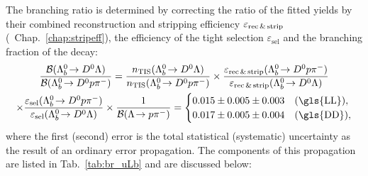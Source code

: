 The branching ratio is determined by correcting the ratio of the fitted yields by their combined reconstruction and stripping efficiency $\varepsilon_\text{rec\,\&\,strip}$ (\cf{}~Chap.~\ref{chap:stripeff}), the efficiency of the tight selection $\varepsilon_\text{sel}$ and the branching fraction of the \decay{\Lz}{\proton\pim} decay:
\begin{multline*}
    \frac{\BR(\decay{\Lb}{\Dz\Lz})}{\BR(\decay{\Lb}{\Dz\proton\pim})} = 
    \frac{n_\text{TIS}(\decay{\Lb}{\Dz\Lz})}{n_\text{TIS}(\decay{\Lb}{\Dz\proton\pim})} \times 
    \frac{\varepsilon_\text{rec\,\&\,strip}(\decay{\Lb}{\Dz\proton\pim})}{\varepsilon_\text{rec\,\&\,strip}(\decay{\Lb}{\Dz\Lz})} \\
    \times \frac{\varepsilon_\text{sel}(\decay{\Lb}{\Dz\proton\pim})}{\varepsilon_\text{sel}(\decay{\Lb}{\Dz\Lz})} \times
    \frac{1}{\BR(\decay{\Lz}{\proton\pim})} =
    \begin{cases}
        0.015 \pm 0.005 \pm 0.003 & \text{(\gls{LL})}, \\
        0.017 \pm 0.005 \pm 0.004 & \text{(\gls{DD})}, \\
    \end{cases} 
\end{multline*}
where the first (second) error is the total statistical (systematic) uncertainty as the result of an ordinary error propagation.
The components of this propagation are listed in Tab.~\ref{tab:br_uLb} and are discussed below:
